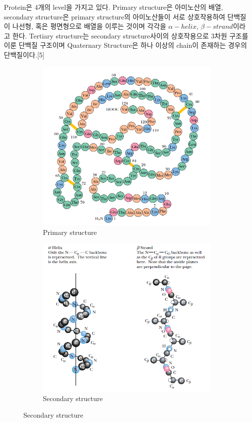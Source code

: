 \documentclass[%
 reprint,
 amsmath,amssymb,
 aps,
]{revtex4-2}
\begin{document}
Protein은 4개의 level을 가지고 있다. Primary structure은 아미노산의 배열, secondary structure은 primary structure의 아미노산들이 서로 상호작용하여 단백질이 나선형, 혹은 평면형으로 배열을 이루는 것이며 각각을 $\alpha-helix$, $\beta-strand$이라고 한다. Tertiary structure는 secondary structure사이의 상호작용으로 3차원 구조를 이룬 단백질 구조이며 Quaternary Structure은 하나 이상의 chain이 존재하는 경우의 단백질이다.[5]
\begin{figure}[htbp]
	\begin{subfigure}{0.4\textwidth}
		\includegraphics[width = 0.5\linewidth]{First.png}%
		\caption{\label{fig:First}Primary structure}
	\end{subfigure}
	\begin{subfigure}{0.4\textwidth}
		\includegraphics[width = 0.5\linewidth]{Second.png}%
		\caption{\label{fig:Second}Secondary structure}
	\end{subfigure}


\end{figure}
\end{document}
